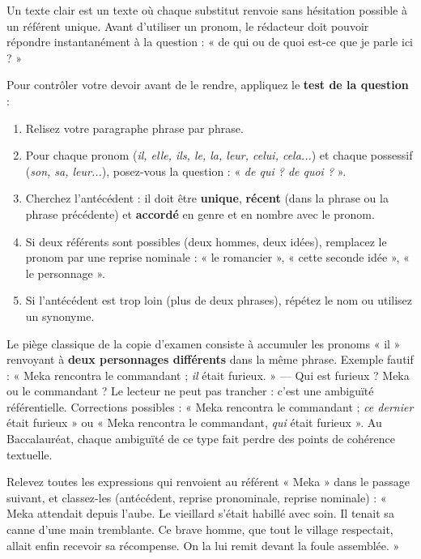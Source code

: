 \documentclass[11pt]{article}
\newcommand{\cle}[1]{{\popxbold\color{popdark}#1}}
\begin{document}
\begin{aretenir}[L'essentiel]
Un texte clair est un texte où chaque substitut renvoie sans hésitation possible à un référent unique. Avant d'utiliser un pronom, le rédacteur doit pouvoir répondre instantanément à la question : « de qui ou de quoi est-ce que je parle ici ? »
\end{aretenir}

\begin{methode}
Pour contrôler votre devoir avant de le rendre, appliquez le \textbf{test de la question} :
\begin{enumerate}
\item Relisez votre paragraphe phrase par phrase.
\item Pour chaque pronom (\emph{il, elle, ils, le, la, leur, celui, cela...}) et chaque possessif (\emph{son, sa, leur...}), posez-vous la question : « \emph{de qui ? de quoi ?} ».
\item Cherchez l'antécédent : il doit être \textbf{unique}, \textbf{récent} (dans la phrase ou la phrase précédente) et \textbf{accordé} en genre et en nombre avec le pronom.
\item Si deux référents sont possibles (deux hommes, deux idées), remplacez le pronom par une reprise nominale : « le romancier », « cette seconde idée », « le personnage ».
\item Si l'antécédent est trop loin (plus de deux phrases), répétez le nom ou utilisez un synonyme.
\end{enumerate}
\end{methode}

\begin{attention}
Le piège classique de la copie d'examen consiste à accumuler les pronoms « il » renvoyant à \textbf{deux personnages différents} dans la même phrase. Exemple fautif : « Meka rencontra le commandant ; \emph{il} était furieux. » — Qui est furieux ? Meka ou le commandant ? Le lecteur ne peut pas trancher : c'est une \cle{ambiguïté référentielle}. Corrections possibles : « Meka rencontra le commandant ; \emph{ce dernier} était furieux » ou « Meka rencontra le commandant, \emph{qui} était furieux ». Au Baccalauréat, chaque ambiguïté de ce type fait perdre des points de cohérence textuelle.
\end{attention}

\begin{exercice}
Relevez toutes les expressions qui renvoient au référent « Meka » dans le passage suivant, et classez-les (antécédent, reprise pronominale, reprise nominale) : « Meka attendait depuis l'aube. Le vieillard s'était habillé avec soin. Il tenait sa canne d'une main tremblante. Ce brave homme, que tout le village respectait, allait enfin recevoir sa récompense. On la lui remit devant la foule assemblée. »
\end{exercice}
\end{document}
